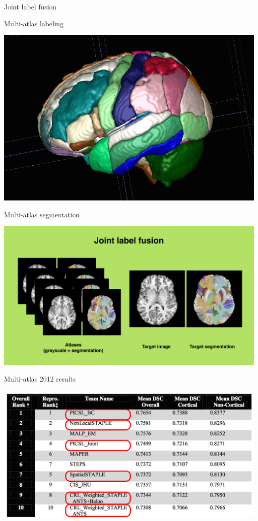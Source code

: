 \documentclass[ignorenonframetext,]{beamer}
\begin{document}
\begin{frame}{Joint label fusion}

\end{frame}

\begin{frame}{Multi-atlas labeling}

\includegraphics{./competitions/figures/NKI30_MALF.png}

\end{frame}

\begin{frame}{Multi-atlas segmentation}

\includegraphics{./Figs/jointLabelFusion.png}

\end{frame}

\begin{frame}{Multi-atlas 2012 results}

\includegraphics{./competitions/figures/MALF2012.png}

\end{frame}
\end{document}
